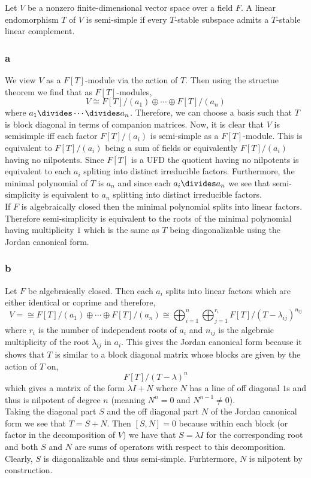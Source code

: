 \documentclass[12pt]{article}
\begin{document}
Let $V$ be a nonzero finite-dimensional vector space over a field $F$. A linear endomorphism $T$ of $V$ is semi-simple if every $T$-stable subspace admits a $T$-stable linear complement.


\subsubsection{a}

We view $V$ as a $F[T]$-module via the action of $T$. Then using the structue theorem we find that as $F[T]$-modules,
\[ V \cong F[T]/(a_1) \oplus \cdots \oplus F[T]/(a_n) \]
where $a_1 \divides \cdots \divides a_n$. Therefore, we can choose a basis such that $T$ is block diagonal in terms of companion matrices. Now, it is clear that $V$ is semisimple iff each factor $F[T]/(a_i)$ is semi-simple as a $F[T]$-module. This is equivalent to $F[T]/(a_i)$ being a sum of fields or equivalently $F[T]/(a_i)$ having no nilpotents. Since $F[T]$ is a UFD the quotient having no nilpotents is equivalent to each $a_i$ spliting into distinct irreducible factors. Furthermore, the minimal polynomial of $T$ is $a_n$ and since each $a_i \divides a_n$ we see that semi-simplicity is equivalent to $a_n$ splitting into distinct irreducible factors.
\bigskip\\
If $F$ is algebraically closed then the minimal polynomial splits into linear factors. Therefore semi-simplicity is equivalent to the roots of the minimal polynomial having multiplicity $1$ which is the same as $T$ being diagonalizable using the Jordan canonical form.

\subsubsection{b}

Let $F$ be algebraically closed. Then each $a_i$ splits into linear factors which are either identical or coprime and therefore,
\[ V = \cong F[T]/(a_1) \oplus \cdots \oplus F[T]/(a_n) \cong \bigoplus_{i = 1}^n \bigoplus_{j = 1}^{r_i} F[T]/(T - \lambda_{ij})^{n_{ij}} \]
where $r_i$ is the number of independent roots of $a_i$ and $n_{ij}$ is the algebraic multiplicity of the root $\lambda_{ij}$ in $a_i$. This gives the Jordan canonical form because it shows that $T$ is similar to a block diagonal matrix whose blocks are given by the action of $T$ on,
\[ F[T]/(T - \lambda)^n \]
which gives a matrix of the form $\lambda I + N$ where $N$ has a line of off diagonal $1$s and thus is nilpotent of degree $n$ (meaning $N^n = 0$ and $N^{n-1} \neq 0$).
\bigskip\\
Taking the diagonal part $S$ and the off diagonal part $N$ of the Jordan canonical form we see that $T = S + N$. Then $[S, N] = 0$ because within each block (or factor in the decomposition of $V$) we have that $S = \lambda I$ for the corresponding root and both $S$ and $N$ are sums of operators with respect to this decomposition. Clearly, $S$ is diagonalizable and thus semi-simple. Furhtermore, $N$ is nilpotent by construction.
\end{document}
